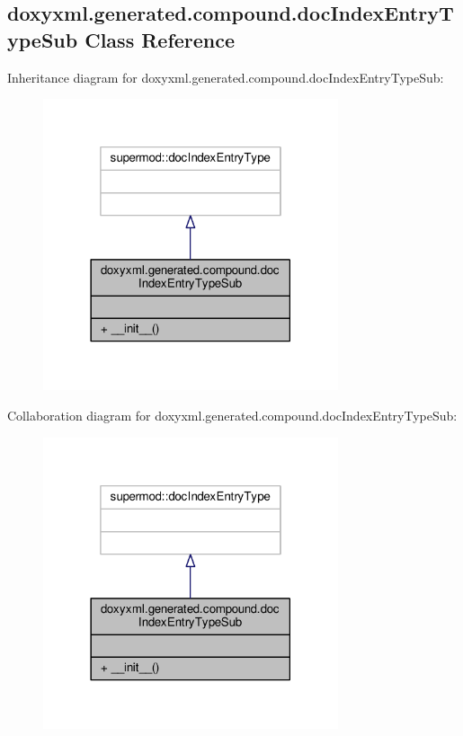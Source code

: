 \subsection{doxyxml.\+generated.\+compound.\+doc\+Index\+Entry\+Type\+Sub Class Reference}
\label{classdoxyxml_1_1generated_1_1compound_1_1docIndexEntryTypeSub}


Inheritance diagram for doxyxml.\+generated.\+compound.\+doc\+Index\+Entry\+Type\+Sub\+:
\nopagebreak
\begin{figure}[H]
\begin{center}
\leavevmode
\includegraphics[width=246pt]{d0/dd4/classdoxyxml_1_1generated_1_1compound_1_1docIndexEntryTypeSub__inherit__graph}
\end{center}
\end{figure}


Collaboration diagram for doxyxml.\+generated.\+compound.\+doc\+Index\+Entry\+Type\+Sub\+:
\nopagebreak
\begin{figure}[H]
\begin{center}
\leavevmode
\includegraphics[width=246pt]{d0/d0f/classdoxyxml_1_1generated_1_1compound_1_1docIndexEntryTypeSub__coll__graph}
\end{center}
\end{figure}
